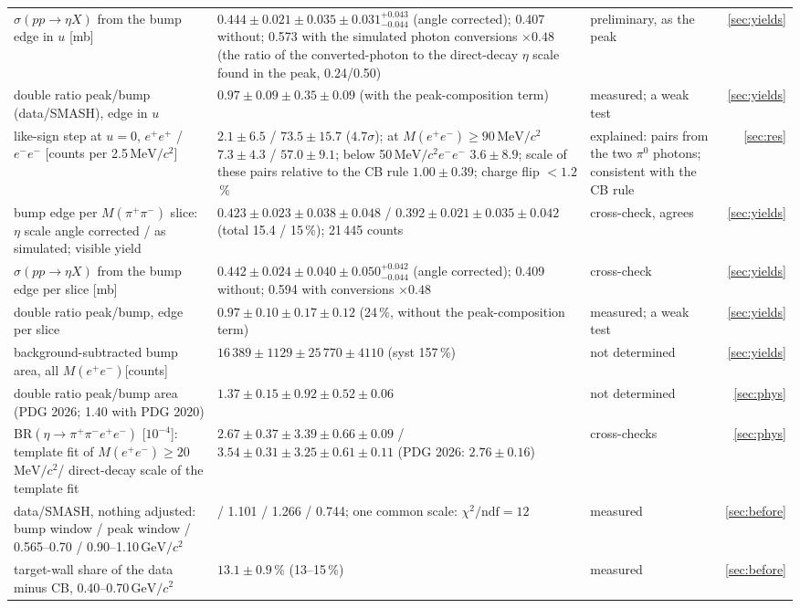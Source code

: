 \documentclass[11pt,a4paper]{article}
\newcommand{\piz}{\ensuremath{\pi^{0}}\xspace}
\newcommand{\ppee}{\ensuremath{\pi^{+}\pi^{-}e^{+}e^{-}}\xspace}
\newcommand{\Mee}{\ensuremath{M(e^{+}e^{-})}\xspace}
\newcommand{\Mpipi}{\ensuremath{M(\pi^{+}\pi^{-})}\xspace}
\newcommand{\GeVcc}{\ensuremath{\mathrm{GeV}/c^{2}}\xspace}
\newcommand{\MeVcc}{\ensuremath{\mathrm{MeV}/c^{2}}\xspace}
\newcommand{\sigeta}{\ensuremath{\sigma(pp\to\eta X)}\xspace}
\begin{document}
{\begin{longtable}{@{}>{\raggedright\arraybackslash}p{4.6cm} >{\raggedright\arraybackslash}p{\dimexpr\textwidth-8.3cm-6\tabcolsep\relax} >{\raggedright\arraybackslash}p{3.0cm} r@{}}
\sigeta from the bump edge in $u$ [mb] & $0.444\pm0.021\pm0.035\pm0.031^{+0.043}_{-0.044}$ (angle corrected); 0.407 without; 0.573 with the simulated photon conversions $\times0.48$ (the ratio of the converted-photon to the direct-decay $\eta$ scale found in the peak, 0.24/0.50) & preliminary, as the peak & \ref{sec:yields} \\
double ratio peak/bump (data/SMASH), edge in $u$ & $0.97\pm0.09\pm0.35\pm0.09$ (with the peak-composition term) & measured; a weak test & \ref{sec:yields} \\
like-sign step at $u=0$, $e^+e^+$ / $e^-e^-$ [counts per 2.5\,\MeVcc] & $2.1\pm6.5$ / $73.5\pm15.7$ ($4.7\sigma$); at \Mee$\ge90$\,\MeVcc $7.3\pm4.3$ / $57.0\pm9.1$; below 50\,\MeVcc $e^-e^-$ $3.6\pm8.9$; scale of these pairs relative to the CB rule $1.00\pm0.39$; charge flip $<1.2$\,\% & explained: pairs from the two \piz photons; consistent with the CB rule & \ref{sec:res} \\
bump edge per \Mpipi slice: $\eta$ scale angle corrected / as simulated; visible yield & $0.423\pm0.023\pm0.038\pm0.048$ / $0.392\pm0.021\pm0.035\pm0.042$ (total 15.4 / 15\,\%); 21\,445 counts & cross-check, agrees & \ref{sec:yields} \\
\sigeta from the bump edge per slice [mb] & $0.442\pm0.024\pm0.040\pm0.050^{+0.042}_{-0.044}$ (angle corrected); 0.409 without; 0.594 with conversions $\times0.48$ & cross-check & \ref{sec:yields} \\
double ratio peak/bump, edge per slice & $0.97\pm0.10\pm0.17\pm0.12$ (24\,\%, without the peak-composition term) & measured; a weak test & \ref{sec:yields} \\
background-subtracted bump area, all \Mee [counts] & $16\,389\pm1129\pm25\,770\pm4110$ (syst 157\,\%) & not determined & \ref{sec:yields} \\
double ratio peak/bump area (PDG 2026; 1.40 with PDG 2020) & $1.37\pm0.15\pm0.92\pm0.52\pm0.06$ & not determined & \ref{sec:phys} \\
BR$(\eta\to\ppee)$ [$10^{-4}$]: template fit of \Mee$\ge20$\,\MeVcc / direct-decay scale of the template fit & $2.67\pm0.37\pm3.39\pm0.66\pm0.09$ / $3.54\pm0.31\pm3.25\pm0.61\pm0.11$ (PDG 2026: $2.76\pm0.16$) & cross-checks & \ref{sec:phys} \\
data/SMASH, nothing adjusted: bump window / peak window / 0.565--0.70 / 0.90--1.10\,\GeVcc & 0.861 / 1.101 / 1.266 / 0.744; one common scale: $\chi^2/\mathrm{ndf}=12$ & measured & \ref{sec:before} \\
target-wall share of the data minus CB, 0.40--0.70\,\GeVcc & $13.1\pm0.9$\,\% (13--15\,\%) & measured & \ref{sec:before} \\

\end{longtable}}
\end{document}
